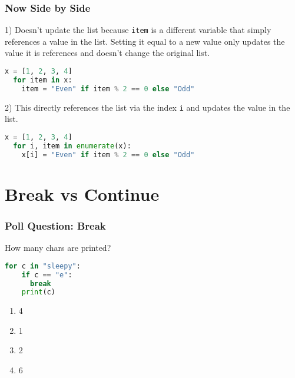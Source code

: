 \documentclass{beamer}
\begin{document}
%
%
\begin{frame}[fragile]
  \frametitle{Now Side by Side}
  1) Doesn't update the list because \lstinline|item| is a different variable that simply references a value in the list. Setting it equal to a new value only updates the value it is references and doesn't change the original list.
  \begin{lstlisting}[language=Python, autogobble]
  x = [1, 2, 3, 4]
  for item in x:
    item = "Even" if item % 2 == 0 else "Odd"
  \end{lstlisting}
  \vfill
  2) This directly references the list via the index \lstinline|i| and updates the value in the list.
  \begin{lstlisting}[language=Python, autogobble]
  x = [1, 2, 3, 4]
  for i, item in enumerate(x):
    x[i] = "Even" if item % 2 == 0 else "Odd"
  \end{lstlisting}
\end{frame}

\section{Break vs Continue}
%
%
\begin{frame}[fragile]
  \frametitle{Poll Question: Break}
  How many chars are printed?
  \begin{lstlisting}[language=Python, autogobble]
  for c in "sleepy":
    if c == "e":
      break
    print(c)
  \end{lstlisting}
  \vfill
  \begin{enumerate}[A]
    \item 4
    \item 1
    \item 2
    \item 6
  \end{enumerate}
\end{frame}
\end{document}
